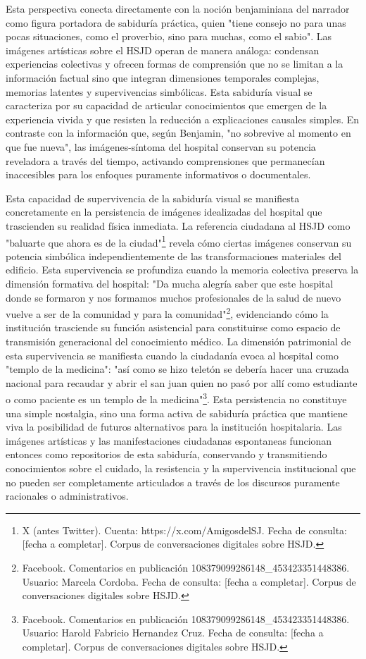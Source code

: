 Esta perspectiva conecta directamente con la noción benjaminiana del narrador como figura portadora de sabiduría práctica, quien "tiene consejo no para unas pocas situaciones, como el proverbio, sino para muchas, como el sabio". Las imágenes artísticas sobre el HSJD operan de manera análoga: condensan experiencias colectivas y ofrecen formas de comprensión que no se limitan a la información factual sino que integran dimensiones temporales complejas, memorias latentes y supervivencias simbólicas. Esta sabiduría visual se caracteriza por su capacidad de articular conocimientos que emergen de la experiencia vivida y que resisten la reducción a explicaciones causales simples. En contraste con la información que, según Benjamin, "no sobrevive al momento en que fue nueva", las imágenes-síntoma del hospital conservan su potencia reveladora a través del tiempo, activando comprensiones que permanecían inaccesibles para los enfoques puramente informativos o documentales.

Esta capacidad de supervivencia de la sabiduría visual se manifiesta concretamente en la persistencia de imágenes idealizadas del hospital que trascienden su realidad física inmediata. La referencia ciudadana al HSJD como "baluarte que ahora es de la ciudad"\footnote{X (antes Twitter). Cuenta: https://x.com/AmigosdelSJ. Fecha de consulta: [fecha a completar]. Corpus de conversaciones digitales sobre HSJD.} revela cómo ciertas imágenes conservan su potencia simbólica independientemente de las transformaciones materiales del edificio. Esta supervivencia se profundiza cuando la memoria colectiva preserva la dimensión formativa del hospital: "Da mucha alegría saber que este hospital donde se formaron y nos formamos muchos profesionales de la salud de nuevo vuelve a ser de la comunidad y para la comunidad"\footnote{Facebook. Comentarios en publicación 108379099286148\_453423351448386. Usuario: Marcela Cordoba. Fecha de consulta: [fecha a completar]. Corpus de conversaciones digitales sobre HSJD.}, evidenciando cómo la institución trasciende su función asistencial para constituirse como espacio de transmisión generacional del conocimiento médico. La dimensión patrimonial de esta supervivencia se manifiesta cuando la ciudadanía evoca al hospital como "templo de la medicina": "así como se hizo teletón se debería hacer una cruzada nacional para recaudar y abrir el san juan quien no pasó por allí como estudiante o como paciente es un templo de la medicina"\footnote{Facebook. Comentarios en publicación 108379099286148\_453423351448386. Usuario: Harold Fabricio Hernandez Cruz. Fecha de consulta: [fecha a completar]. Corpus de conversaciones digitales sobre HSJD.}. Esta persistencia no constituye una simple nostalgia, sino una forma activa de sabiduría práctica que mantiene viva la posibilidad de futuros alternativos para la institución hospitalaria. Las imágenes artísticas y las manifestaciones ciudadanas espontaneas funcionan entonces como repositorios de esta sabiduría, conservando y transmitiendo conocimientos sobre el cuidado, la resistencia y la supervivencia institucional que no pueden ser completamente articulados a través de los discursos puramente racionales o administrativos.

